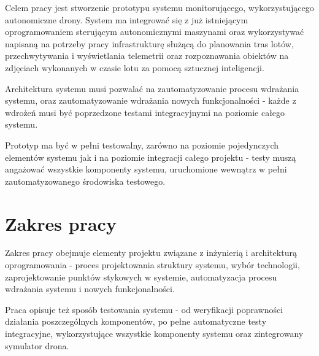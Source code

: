 Celem pracy jest stworzenie prototypu systemu monitorującego, wykorzystującego
autonomiczne drony. System ma integrować się z już istniejącym oprogramowaniem
sterującym autonomicznymi maszynami oraz wykorzystywać napisaną na potrzeby pracy
infrastrukturę służącą do planowania tras lotów, przechwytywania i wyświetlania
telemetrii oraz rozpoznawania obiektów na zdjęciach wykonanych w czasie lotu za
pomocą sztucznej inteligencji.

Architektura systemu musi pozwalać na zautomatyzowanie procesu wdrażania
systemu, oraz zautomatyzowanie wdrażania nowych funkcjonalności - każde
z wdrożeń musi być poprzedzone testami integracyjnymi na poziomie całego systemu. 

Prototyp ma być w pełni testowalny, zarówno na poziomie pojedynczych
elementów systemu jak i na poziomie integracji całego projektu - testy muszą
angażować wszystkie komponenty systemu, uruchomione wewnątrz w pełni
zautomatyzowanego środowiska testowego.

\section{Zakres pracy}

Zakres pracy obejmuje elementy projektu związane z
inżynierią i architekturą oprogramowania - proces projektowania struktury systemu,
wybór technologii, zaprojektowanie punktów stykowych w systemie, automatyzacja
procesu wdrażania systemu i nowych funkcjonalności.

Praca opisuje też sposób testowania systemu - od weryfikacji poprawności działania poszczególnych
komponentów, po pełne automatyczne testy integracyjne, wykorzystujące wszystkie
komponenty systemu oraz zintegrowany symulator drona. 
